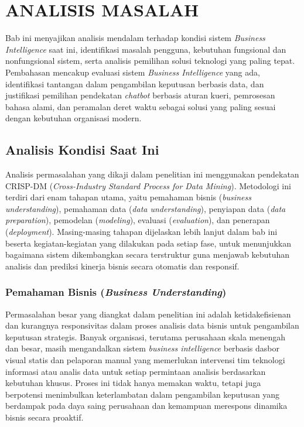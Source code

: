 \chapter{ANALISIS MASALAH}
\label{chap:analisis-masalah}

Bab ini menyajikan analisis mendalam terhadap kondisi sistem \textit{Business Intelligence} saat ini, identifikasi masalah pengguna, kebutuhan fungsional dan nonfungsional sistem, serta analisis pemilihan solusi teknologi yang paling tepat. Pembahasan mencakup evaluasi sistem \textit{Business Intelligence} yang ada, identifikasi tantangan dalam pengambilan keputusan berbasis data, dan justifikasi pemilihan pendekatan \textit{chatbot} berbasis aturan kueri, pemrosesan bahasa alami, dan peramalan deret waktu sebagai solusi yang paling sesuai dengan kebutuhan organisasi modern.

\section{Analisis Kondisi Saat Ini}

Analisis permasalahan yang dikaji dalam penelitian ini menggunakan pendekatan CRISP-DM (\textit{Cross-Industry Standard Process for Data Mining}). Metodologi ini terdiri dari enam tahapan utama, yaitu pemahaman bisnis (\textit{business understanding}), pemahaman data (\textit{data understanding}), penyiapan data (\textit{data preparation}), pemodelan (\textit{modeling}), evaluasi (\textit{evaluation}), dan penerapan (\textit{deployment}). Masing-masing tahapan dijelaskan lebih lanjut dalam bab ini beserta kegiatan-kegiatan yang dilakukan pada setiap fase, untuk menunjukkan bagaimana sistem dikembangkan secara terstruktur guna menjawab kebutuhan analisis dan prediksi kinerja bisnis secara otomatis dan responsif.

\subsection{Pemahaman Bisnis (\textit{Business Understanding})}

Permasalahan besar yang diangkat dalam penelitian ini adalah ketidakefisienan dan kurangnya responsivitas dalam proses analisis data bisnis untuk pengambilan keputusan strategis. Banyak organisasi, terutama perusahaan skala menengah dan besar, masih mengandalkan sistem \textit{business intelligence} berbasis dasbor visual statis dan pelaporan manual yang memerlukan intervensi tim teknologi informasi atau analis data untuk setiap permintaan analisis berdasarkan kebutuhan khusus. Proses ini tidak hanya memakan waktu, tetapi juga berpotensi menimbulkan keterlambatan dalam pengambilan keputusan yang berdampak pada daya saing perusahaan dan kemampuan merespons dinamika bisnis secara proaktif.

